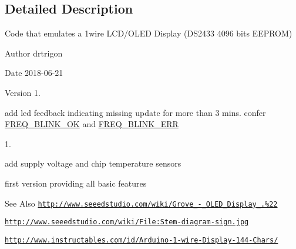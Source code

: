 \subsection{Detailed Description}
Code that emulates a 1wire L\-C\-D/\-O\-L\-E\-D Display (D\-S2433 4096 bits E\-E\-P\-R\-O\-M) \begin{DoxyAuthor}{Author}
drtrigon 
\end{DoxyAuthor}
\begin{DoxyDate}{Date}
2018-\/06-\/21 
\end{DoxyDate}
\begin{DoxyVersion}{Version}
1. \begin{DoxyItemize}
\item add led feedback indicating missing update for more than 3 mins. confer \hyperlink{OWH__DS2433__EEPROM__LCD__Sensors_8ino_a9599efa23e764c5668c6a8ee51c8228e}{F\-R\-E\-Q\-\_\-\-B\-L\-I\-N\-K\-\_\-\-O\-K} and \hyperlink{OWH__DS2433__EEPROM__LCD__Sensors_8ino_afcca8b19968c1fe4a177d898c82b3cf5}{F\-R\-E\-Q\-\_\-\-B\-L\-I\-N\-K\-\_\-\-E\-R\-R} \end{DoxyItemize}


1. \begin{DoxyItemize}
\item add supply voltage and chip temperature sensors \item first version providing all basic features\end{DoxyItemize}

\end{DoxyVersion}
\begin{DoxySeeAlso}{See Also}
\href{http://www.seeedstudio.com/wiki/Grove_-_OLED_Display_1.12%22}{\tt http\-://www.\-seeedstudio.\-com/wiki/\-Grove\-\_\--\/\-\_\-\-O\-L\-E\-D\-\_\-\-Display\-\_\-1.\-12\%22} 

\href{http://www.seeedstudio.com/wiki/File:Stem-diagram-sign.jpg}{\tt http\-://www.\-seeedstudio.\-com/wiki/\-File\-:\-Stem-\/diagram-\/sign.\-jpg} 

\href{http://www.instructables.com/id/Arduino-1-wire-Display-144-Chars/}{\tt http\-://www.\-instructables.\-com/id/\-Arduino-\/1-\/wire-\/\-Display-\/144-\/\-Chars/}
\end{DoxySeeAlso}
